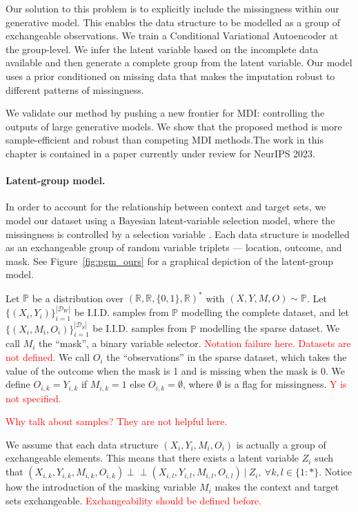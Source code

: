 \documentclass[a4paper,12pt,twoside,openright]{article}
\newcommand{\crit}[1]{\textcolor{red}{#1}}
\newcommand{\ind}{\perp\!\!\!\!\perp}
\begin{document}
Our solution to this problem is to explicitly include the missingness within our generative model. This enables the data structure to be modelled as a group of exchangeable observations. We train a Conditional Variational Autoencoder at the group-level. We infer the latent variable based on the incomplete data available and then generate a complete group from the latent variable. Our model uses a prior conditioned on missing data that makes the imputation robust to different patterns of missingness.

We validate our method by pushing a new frontier for MDI: controlling the outputs of large generative models. We show that the proposed method is more sample-efficient and robust than competing MDI methods.The work in this chapter is contained in a paper currently under review for NeurIPS 2023.

\paragraph{Latent-group model.} In order to account for the relationship between context and target sets, we model our dataset using a Bayesian latent-variable selection model, where the missingness is controlled by a selection variable \parencite{duBayesianLatentVariable2022, heckmanSampleSelectionBias1977}. Each data structure is modelled as an exchangeable group of random variable triplets --- location, outcome, and mask. See Figure~\ref{fig:pgm_ours} for a graphical depiction of the latent-group model.

Let $\mathbb{P}$ be a distribution over $(\mathbb{R}, \mathbb{R}, \{0,1\}, \mathbb{R})^*$ with $(X, Y, M, O) \sim \mathbb{P}$. Let $\{(X_i, Y_i)\}_{i=1}^{|\mathcal{D}_W|}$ be I.I.D. samples from $\mathbb{P}$ modelling the complete dataset, and let $\{(X_i, M_i, O_i)\}_{i=1}^{|\mathcal{D}_S|}$ be I.I.D. samples from $\mathbb{P}$ modelling the sparse dataset. We call $M_i$ the ``mask'', a binary variable selector. \crit{Notation failure here. Datasets are not defined.} We call $O_i$ the ``observations'' in the sparse dataset, which takes the value of the outcome when the mask is 1 and is missing when the mask is 0. We define $O_{i,k} = Y_{i,k}$ if $M_{i,k} = 1$ else $O_{i,k} = \emptyset$, where $\emptyset$ is a flag for missingness. \crit{Y is not specified.}

\crit{Why talk about samples? They are not helpful here.}

We assume that each data structure $(X_i, Y_i, M_i, O_i)$ is actually a group of exchangeable elements. This means that there exists a latent variable $Z_i$ such that $(X_{i,k}, Y_{i,k}, M_{i,k}, O_{i,k}) \ind (X_{i,l}, Y_{i,l}, M_{i,l}, O_{i,l}) ~ | ~ Z_i, ~ \forall k,l \in \{1:*\}$. Notice how the introduction of the masking variable $M_i$ makes the context and target sets exchangeable. \crit{Exchangeability should be defined before.}
\end{document}
